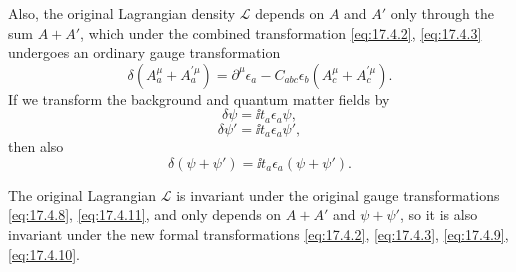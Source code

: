 Also, the original Lagrangian density $\mathcal L$ depends on $A$ and $A'$
only through the sum $A+A'$, which under the combined transformation
\eqref{eq:17.4.2}, \eqref{eq:17.4.3} undergoes an ordinary gauge
transformation
\begin{equation}
\delta(A_a^\mu+A_a^{\prime\mu})
=\partial^\mu\epsilon_a
-C_{abc}\epsilon_b
(A_c^\mu+A_c^{\prime\mu}).
\label{eq:17.4.8}
\end{equation}
If we transform the background and quantum matter fields by
\begin{equation}
\delta\psi=\ii t_a\epsilon_a\psi,
\label{eq:17.4.9}
\end{equation}
\begin{equation}
\delta\psi'=\ii t_a\epsilon_a\psi',
\label{eq:17.4.10}
\end{equation}
then also
\begin{equation}
\delta(\psi+\psi')=\ii t_a\epsilon_a(\psi+\psi').
\label{eq:17.4.11}
\end{equation}

The original Lagrangian $\mathcal L$ is invariant under the original gauge
transformations \eqref{eq:17.4.8}, \eqref{eq:17.4.11}, and only depends on
$A+A'$ and $\psi+\psi'$, so it is also invariant under the new formal
transformations \eqref{eq:17.4.2}, \eqref{eq:17.4.3},
\eqref{eq:17.4.9}, \eqref{eq:17.4.10}.

